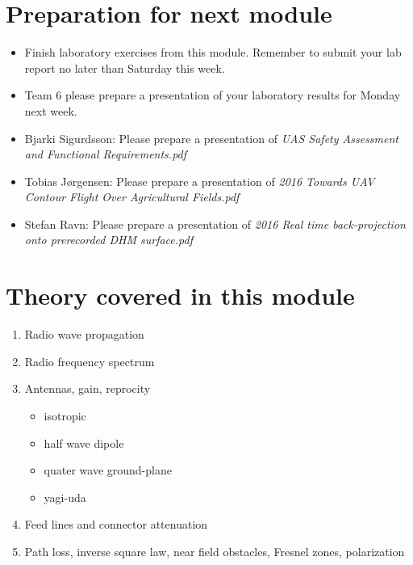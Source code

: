 \documentclass[a4paper,10pt,fleqn]{article}
\begin{document}
\section{Preparation for next module}

\begin{itemize}

\item Finish laboratory exercises from this module. Remember to submit your lab report no later than Saturday this week.

\item Team  6 please prepare a presentation of your laboratory results for Monday next week.

\item Bjarki Sigurdsson: Please prepare a presentation of \textit{UAS Safety Assessment and Functional Requirements.pdf} 

\item Tobias Jørgensen: Please prepare a presentation of \textit{2016 Towards UAV Contour Flight Over Agricultural Fields.pdf} 

\item Stefan Ravn: Please prepare a presentation of \textit{2016 Real time back-projection onto prerecorded DHM surface.pdf} 

\end{itemize}


\section{Theory covered in this module}

\begin{enumerate}
	\item Radio wave propagation
	\item Radio frequency spectrum
	\item Antennas, gain, reprocity
	\begin{itemize}
		\item isotropic
		\item half wave dipole
		\item quater wave ground-plane
		\item yagi-uda 
	\end{itemize}
	\item Feed lines and connector attenuation
	\item Path loss, inverse square law, near field obstacles, Fresnel zones, polarization
\end{enumerate}
\end{document}
